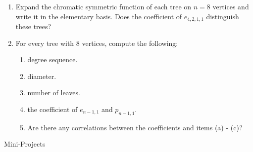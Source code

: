 \documentclass{article}
\begin{document}
\begin{enumerate}
\item Expand the chromatic symmetric function of each tree on $n=8$ vertices and write it in the elementary basis.  Does the coefficient of $e_{4,2,1,1}$ distinguish these trees? 

\item For every tree with 8 vertices, compute the following: 
\begin{enumerate}
\item degree sequence. 
\item diameter. 
\item number of leaves. 
\item the coefficient of $e_{n-1,1}$ and $p_{n-1,1}$.
\item Are there any correlations between the coefficients and items (a) - (c)? 
\end{enumerate}
\end{enumerate}
\centerline{\Large Mini-Projects}
\end{document}
